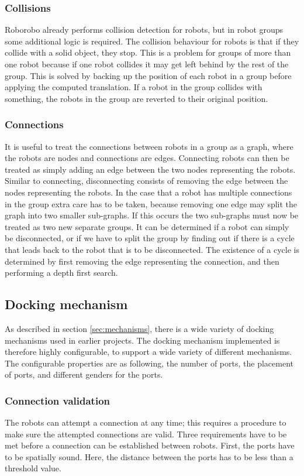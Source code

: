 \subsubsection{Collisions}
Roborobo already performs collision detection for robots, but in robot groups some additional logic is required.
The collision behaviour for robots is that if they collide with a solid object, they stop.
This is a problem for groups of more than one robot because if one robot collides it may get left behind by the rest of the group.
This is solved by backing up the position of each robot in a group before applying the computed translation.
If a robot in the group collides with something, the robots in the group are reverted to their original position.

\subsubsection{Connections}
It is useful to treat the connections between robots in a group as a graph, where the robots are nodes and connections are edges.
Connecting robots can then be treated as simply adding an edge between the two nodes representing the robots.
Similar to connecting, disconnecting consists of removing the edge between the nodes representing the robots.
In the case that a robot has multiple connections in the group extra care has to be taken, because removing one edge may split the graph into two smaller sub-graphs.
If this occurs the two sub-graphs must now be treated as two new separate groups.
It can be determined if a robot can simply be disconnected, or if we have to split the group by finding out if there is a cycle that leads back to the robot that is to be disconnected.
The existence of a cycle is determined by first removing the edge representing the connection, and then performing a depth first search.
	
	 
\subsection{Docking mechanism}
As described in section \ref{sec:mechanisms}, there is a wide variety of docking mechanisms used in earlier projects.
The docking mechanism implemented is therefore highly configurable, to support a wide variety of different mechanisms.
The configurable properties are as following, the number of ports, the placement of ports, and different genders for the ports. 

\subsubsection{Connection validation}
The robots can attempt a connection at any time; this requires a procedure to make sure the attempted connections are valid.
Three requirements have to be met before a connection can be established between robots.
First, the ports have to be spatially sound. 
Here, the distance between the ports has to be less than a threshold value.

